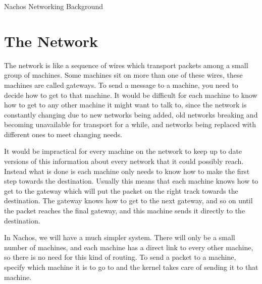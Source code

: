

\begin{center}
{\large Nachos Networking Background}
\end{center}

\vspace{.2in}

\section{The Network}



The network is like a sequence of wires which transport packets among 
a small group of machines.  Some machines sit on more than one of these
wires, these machines are called gateways.  To send a message to a machine,
you need to decide how to get to that machine.  It would be difficult for
each machine to know how to get to any other machine it might want to talk
to, since the network is constantly changing due to new networks being added,
old networks breaking and becoming unavailable for transport for a while,
and networks being replaced with different ones to meet changing needs.

It would be impractical for every machine on the network to keep up to date
versions of this information about every network that it could possibly reach.
Instead what is done is each machine only needs to know how to make the first
step towards the destination.  Usually this means that each machine knows
how to get to the gateway which will put the packet on the right track towards
the destination.  The gateway knows how to get to the next gateway, and
so on until the packet reaches the final gateway, and this machine 
sends it directly to the destination.

In Nachos, we will have a much simpler system.  There will only be a
small number of machines, and each machine has a direct link to every
other machine, so there is no need for this kind of routing.  To send a
packet to a machine, specify which machine it is to go to and the
kernel takes care of sending it to that machine.

